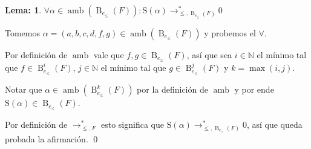 \documentclass{report}
\theoremstyle{customstyle}
\newtheorem{lemma}{Lema:}[chapter]
\renewenvironment{proof}[1][\proofname]{{\bfseries #1: }}{\qed} %
\theoremstyle{factstyle}
\DeclareMathOperator{\amb}{amb}
\renewcommand{\S}{\text{S}}
\DeclareMathOperator{\B}{B}
\begin{document}
\begin{lemma}\label{lemma:Buchberger correctitud:6}
$∀α ∈ \amb(\B_{e_≤}(F)) : \S(α) →^*_{≤, \B_{e_≤}(F)} 0$
\end{lemma}
\begin{proof}
Tomemos $α = (a, b, c, d, f, g) ∈ \amb(\B_{e_≤}(F))$ y probemos el $∀$.

Por definición de $\amb$ vale que $f, g ∈ \B_{e_≤}(F)$, así que sea $i ∈ ℕ$ el mínimo tal que $f ∈ \B_{e_≤}^i(F)$, $j ∈ ℕ$ el mínimo tal que $g ∈ \B_{e_≤}^j(F)$ y $k = \max(i, j)$.

Notar que $α ∈ \amb(\B_{e_≤}^k(F))$ por la definición de $\amb$ y por ende $\S(α) ∈ \B_{e_≤}(F)$.

Por definición de $→^*_{≤, F}$ esto significa que $\S(α) →^*_{≤, \B_{e_≤}(F)} 0$, así que queda probada la afirmación.
\end{proof}
\end{document}
